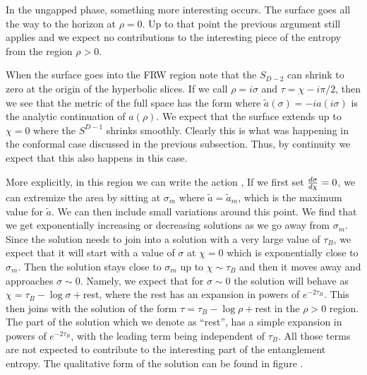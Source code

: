 
In the ungapped phase, something more interesting occurs. The surface goes all the way to the horizon at
$\rho =0$. Up to that point the previous argument still applies and we expect no contributions to the
interesting piece of the entropy from the region $\rho > 0$.

When the surface goes into the FRW region note that the $S_{D-2}$ can shrink to zero at the origin
of the hyperbolic slices. If we call $\rho = i \sigma$ and $\tau = \chi - i \pi/2$, then we see that
the metric of the full space has the form
\eqn{}
where $\tilde a(\sigma ) = - i a(i \sigma )$ is the analytic continuation of $a(\rho)$.
We expect that the surface extends up to $\chi =0$ where the $S^{D-1}$ shrinks smoothly. Clearly this is
what was happening in the conformal case discussed in the previous subsection.  Thus, by continuity we expect that this also happens in
this case.

More explicitly, in this region we can write the action \actwom ,
\eqn{}
%
\ifig{} {}
%
If we first set ${ d \sigma \over d \chi } =0$, we can extremize the area by sitting at $\sigma_m$ where
$\tilde a=\tilde a_m$, which is the maximum value for $\tilde a $.
We can then include small variations around this point. We find that we get exponentially increasing or
decreasing
solutions as we go away from $\sigma_m$. Since the solution needs to join into
 a solution with a very
large value of $\tau_B$, we expect that it will start with a value of $\sigma$ at $\chi=0$ which is
exponentially close to $\sigma_m$. Then the solution stays close to $\sigma_m$ up to $\chi \sim \tau_B$ and
then it moves away and approaches $\sigma \sim 0$. Namely, we expect that for $\sigma \sim 0$ the
solution will behave as
$\chi = \tau_B - \log \sigma + $rest, where the rest has an expansion in powers of $e^{ - 2 \tau_B}$.
This then joins with the solution of the form
$\tau = \tau_B - \log \rho +$rest in the $\rho>0$ region.
The part of the solution which we denote as ``rest'', has a simple expansion in powers of
$e^{ - 2 \tau_B}$, with
the leading term being independent of $\tau_B$. All those terms are not expected to contribute to the
interesting part of the entanglement entropy.
The qualitative form of the solution can be found in figure \plottwo .

